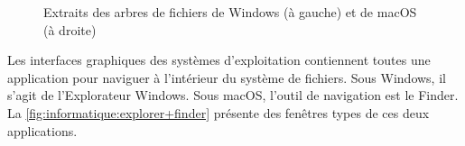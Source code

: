 \begin{figure}
  \begin{minipage}[t]{0.45\linewidth}
  \end{minipage}
  \hfill
  \begin{minipage}[t]{0.45\linewidth}
  \end{minipage}
  \caption[Extraits de la hiérarchie des systèmes de fichiers]{%
    Extraits des arbres de fichiers de Windows (à gauche) et de
    macOS (à droite)}
  \label{fig:informatique:fs}
\end{figure}

Les interfaces graphiques des systèmes d'exploitation contiennent
toutes une application pour naviguer à l'intérieur du système de
fichiers. Sous Windows, il s'agit de l'Explorateur Windows. Sous macOS, l'outil de navigation est
le Finder. La \autoref{fig:informatique:explorer+finder}
présente des fenêtres types de ces deux applications.

